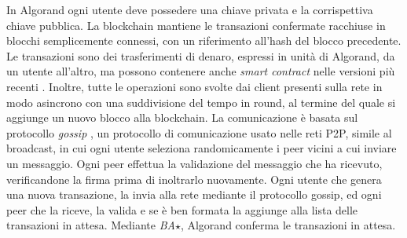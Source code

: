 In Algorand ogni utente deve possedere una chiave privata e la corrispettiva chiave pubblica. La blockchain mantiene le transazioni confermate racchiuse in blocchi semplicemente connessi, con un riferimento all'hash del blocco precedente. Le transazioni sono dei trasferimenti di denaro, espressi in unità di Algorand, da un utente all'altro, ma possono contenere anche \emph{smart contract} nelle versioni più recenti \cite{smartcontract2019algo, smartcontract2020algo}. Inoltre, tutte le operazioni sono svolte dai client presenti sulla rete in modo asincrono con una suddivisione del tempo in round, al termine del quale si aggiunge un nuovo blocco alla blockchain.
La comunicazione è basata sul protocollo \emph{gossip} \cite{kermarrec2007gossiping}, un protocollo di comunicazione usato nelle reti P2P, simile al broadcast, in cui ogni utente seleziona randomicamente i peer vicini a cui inviare un messaggio. Ogni peer effettua la validazione del messaggio che ha ricevuto, verificandone la firma prima di inoltrarlo nuovamente. Ogni utente che genera una nuova transazione, la invia alla rete mediante il protocollo gossip, ed ogni peer che la riceve, la valida e se è ben formata la aggiunge alla lista delle transazioni in attesa. Mediante \emph{BA$\star$}, Algorand conferma le transazioni in attesa.

